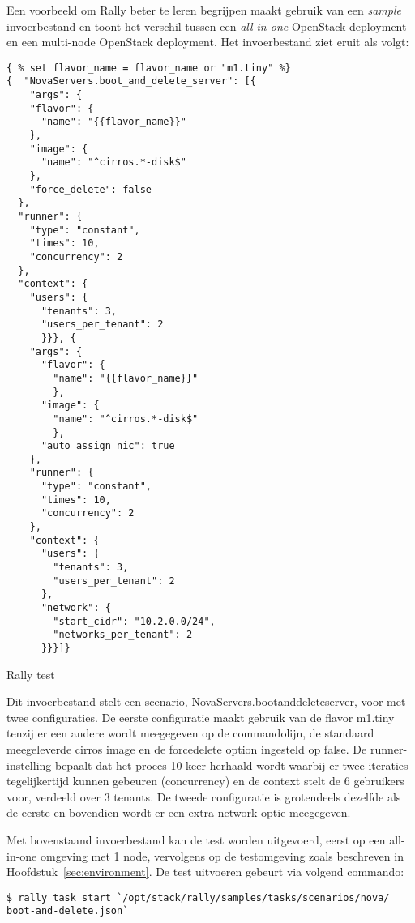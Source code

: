 Een voorbeeld om Rally beter te leren begrijpen maakt gebruik van een \textit{sample} invoerbestand en toont het verschil tussen een \textit{all-in-one} OpenStack deployment en een multi-node OpenStack deployment. Het invoerbestand ziet eruit als volgt:

\begin{code}
\begin{verbatim}
{ % set flavor_name = flavor_name or "m1.tiny" %}
{  "NovaServers.boot_and_delete_server": [{
    "args": {
    "flavor": {
      "name": "{{flavor_name}}"
    },
    "image": {
      "name": "^cirros.*-disk$"
    },
    "force_delete": false
  },
  "runner": {
    "type": "constant",
    "times": 10,
    "concurrency": 2
  },
  "context": {
    "users": {
      "tenants": 3,
      "users_per_tenant": 2
      }}}, {
    "args": {
      "flavor": {
        "name": "{{flavor_name}}"
        },
      "image": {
        "name": "^cirros.*-disk$"
        },
      "auto_assign_nic": true
    },
    "runner": {
      "type": "constant",
      "times": 10,
      "concurrency": 2
    },
    "context": {
      "users": {
        "tenants": 3,
        "users_per_tenant": 2
      },
      "network": {
        "start_cidr": "10.2.0.0/24",
        "networks_per_tenant": 2
      }}}]}
\end{verbatim}
\caption{Rally test}
\end{code}

Dit invoerbestand stelt een scenario, NovaServers.boot\textunderscore and\textunderscore delete\textunderscore server, voor met twee configuraties. De eerste configuratie maakt gebruik van de flavor m1.tiny tenzij er een andere wordt meegegeven op de commandolijn, de standaard meegeleverde cirros image en de force\textunderscore delete option ingesteld op false. De runner-instelling bepaalt dat het proces 10 keer herhaald wordt waarbij er twee iteraties tegelijkertijd kunnen gebeuren (concurrency) en de context stelt de 6 gebruikers voor, verdeeld over 3 tenants. De tweede configuratie is grotendeels dezelfde als de eerste en bovendien wordt er een extra network-optie meegegeven.

Met bovenstaand invoerbestand kan de test worden uitgevoerd, eerst op een all-in-one omgeving met 1 node, vervolgens op de testomgeving zoals beschreven in Hoofdstuk~\ref{sec:environment}. De test uitvoeren gebeurt via volgend commando:

\begin{code}
\begin{verbatim}
$ rally task start `/opt/stack/rally/samples/tasks/scenarios/nova/
boot-and-delete.json`
\end{verbatim}
\end{code}

